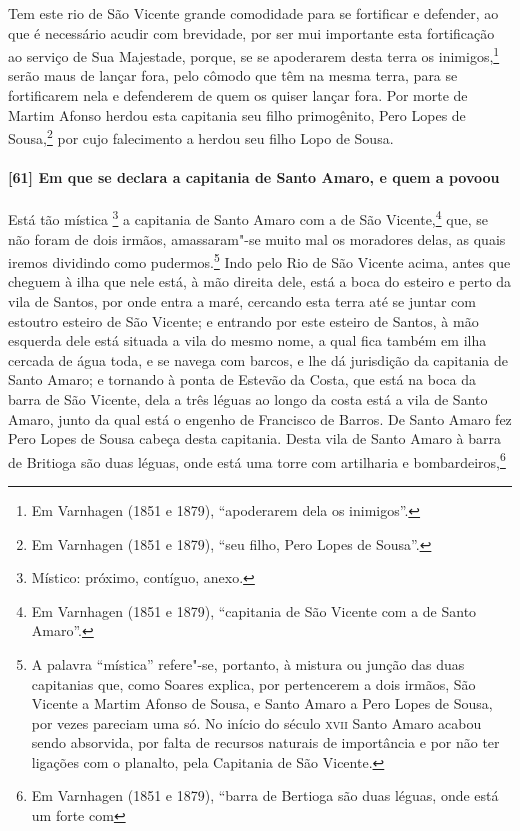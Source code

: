 \begin{linenumbers}
Tem este rio de São Vicente grande comodidade para se fortificar e defender, ao que é
necessário acudir com brevidade, por ser mui importante esta fortificação ao serviço de
Sua Majestade, porque, se se apoderarem desta terra os inimigos,\footnote{ Em Varnhagen
(1851 e 1879), ``apoderarem dela os inimigos''.} serão maus de lançar fora, pelo cômodo
que têm na mesma terra, para se fortificarem nela e defenderem de quem os quiser lançar
fora. Por morte de Martim Afonso herdou esta capitania seu filho primogênito, Pero Lopes
de Sousa,\footnote{ Em Varnhagen (1851 e 1879), ``seu filho, Pero Lopes de Sousa''.} por
cujo falecimento a herdou seu filho Lopo de Sousa.

\paragraph{[61] Em que se declara a capitania de Santo Amaro, e quem a povoou} \quad
Está tão mística \footnote{ Místico: próximo, contíguo, anexo.} a capitania de Santo Amaro
com a de São Vicente,\footnote{ Em Varnhagen (1851 e 1879), ``capitania de São Vicente com
a de Santo Amaro''.} que, se não foram de dois irmãos, amassaram"-se muito mal os moradores
delas, as quais iremos dividindo como pudermos.\footnote{ A palavra ``mística'' refere"-se,
portanto, à mistura ou junção das duas capitanias que, como Soares explica, por
pertencerem a dois irmãos, São Vicente a Martim Afonso de Sousa, e Santo Amaro a Pero Lopes
de Sousa, por vezes pareciam uma só. No início do século \textsc{xvii} Santo Amaro acabou
sendo absorvida, por falta de recursos naturais de importância e por não ter ligações com
o planalto, pela Capitania de São Vicente.} Indo pelo Rio de São Vicente acima, antes que
cheguem à ilha que nele está, à mão direita dele, está a boca do esteiro e perto da vila
de Santos, por onde entra a maré, cercando esta terra até se juntar com estoutro esteiro
de São Vicente; e entrando por este esteiro de Santos, à mão esquerda dele está situada a
vila do mesmo nome, a qual fica também em ilha cercada de água toda, e se navega com
barcos, e lhe dá jurisdição da capitania de Santo Amaro; e tornando à ponta de Estevão da
Costa, que está na boca da barra de São Vicente, dela a três léguas ao longo da costa está
a vila de Santo Amaro, junto da qual está o engenho de Francisco de Barros. De Santo Amaro
fez Pero Lopes de Sousa cabeça desta capitania. Desta vila de Santo Amaro à barra de
Britioga são duas léguas, onde está uma torre com artilharia e bombardeiros,\footnote{ Em
Varnhagen (1851 e 1879), ``barra de Bertioga são duas léguas, onde está um forte com
}
\end{linenumbers}
